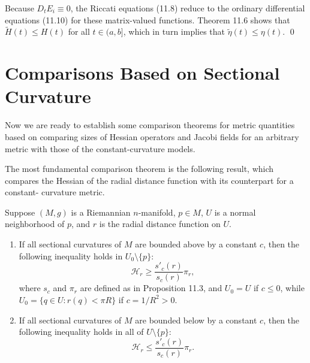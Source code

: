 Because $D_t E_i \equiv 0$, the Riccati equations (11.8) reduce to the ordinary differential
equations (11.10) for these matrix-valued functions. Theorem 11.6 shows that
$\tilde{H}(t) \leq H(t)$ for all $t \in (a,b]$, which in turn implies that $\tilde{\eta}(t) \leq \eta(t)$. \qed

\section{Comparisons Based on Sectional Curvature}

Now we are ready to establish some comparison theorems for metric quantities
based on comparing sizes of Hessian operators and Jacobi fields for an arbitrary
metric with those of the constant-curvature models.

The most fundamental comparison theorem is the following result, which compares
the Hessian of the radial distance function with its counterpart for a constant-
curvature metric.

\begin{theorem}
\label{thm:hessian-comparison}

Suppose $(M, g)$ is a Riemannian $n$-manifold, $p \in M$, $U$ is a normal neighborhood of $p$, and $r$ is the radial distance function
on $U$.

\begin{enumerate}
\item[(a)] If all sectional curvatures of $M$ are bounded above by a constant $c$, then the
following inequality holds in $U_0 \setminus \{p\}$:
\begin{equation}
\mathcal{H}_r \geq \frac{s'_c(r)}{s_c(r)}\pi_r,
\tag{11.17}
\end{equation}
where $s_c$ and $\pi_r$ are defined as in Proposition 11.3, and $U_0 = U$ if $c \leq 0$,
while $U_0 = \{q \in U : r(q) < \pi R\}$ if $c = 1/R^2 > 0$.

\item[(b)] If all sectional curvatures of $M$ are bounded below by a constant $c$, then the
following inequality holds in all of $U \setminus \{p\}$:
\begin{equation}
\mathcal{H}_r \leq \frac{s'_c(r)}{s_c(r)}\pi_r.
\tag{11.18}
\end{equation}
\end{enumerate}

\end{theorem}

